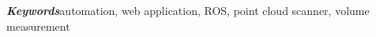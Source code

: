 \vspace{1cm}

\noindent\textit{\textbf{Keywords}}\textemdash automation, web application, ROS, point cloud scanner, volume measurement

